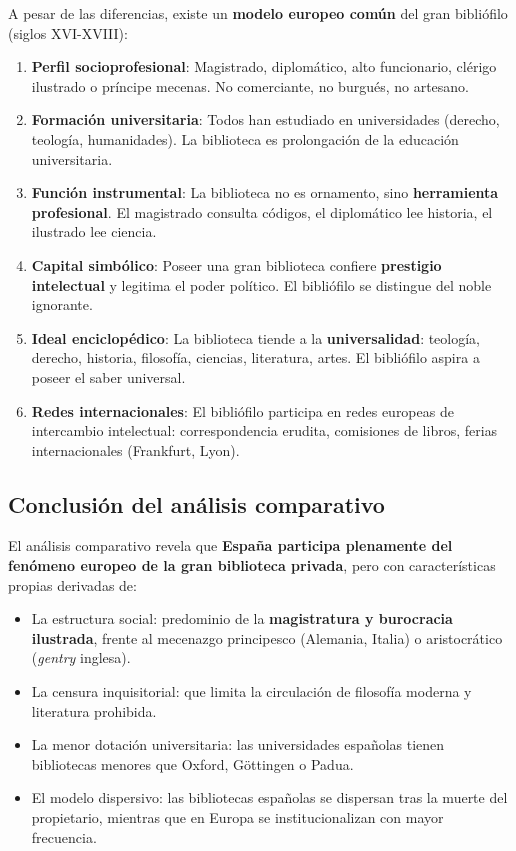 \documentclass[11pt,a4paper]{article}
\begin{document}
A pesar de las diferencias, existe un \textbf{modelo europeo común} del gran bibliófilo (siglos XVI-XVIII):

\begin{enumerate}
\item \textbf{Perfil socioprofesional}: Magistrado, diplomático, alto funcionario, clérigo ilustrado o príncipe mecenas. No comerciante, no burgués, no artesano.

\item \textbf{Formación universitaria}: Todos han estudiado en universidades (derecho, teología, humanidades). La biblioteca es prolongación de la educación universitaria.

\item \textbf{Función instrumental}: La biblioteca no es ornamento, sino \textbf{herramienta profesional}. El magistrado consulta códigos, el diplomático lee historia, el ilustrado lee ciencia.

\item \textbf{Capital simbólico}: Poseer una gran biblioteca confiere \textbf{prestigio intelectual} y legitima el poder político. El bibliófilo se distingue del noble ignorante.

\item \textbf{Ideal enciclopédico}: La biblioteca tiende a la \textbf{universalidad}: teología, derecho, historia, filosofía, ciencias, literatura, artes. El bibliófilo aspira a poseer el saber universal.

\item \textbf{Redes internacionales}: El bibliófilo participa en redes europeas de intercambio intelectual: correspondencia erudita, comisiones de libros, ferias internacionales (Frankfurt, Lyon).
\end{enumerate}

\subsection{Conclusión del análisis comparativo}

El análisis comparativo revela que \textbf{España participa plenamente del fenómeno europeo de la gran biblioteca privada}, pero con características propias derivadas de:

\begin{itemize}
\item La estructura social: predominio de la \textbf{magistratura y burocracia ilustrada}, frente al mecenazgo principesco (Alemania, Italia) o aristocrático (\textit{gentry} inglesa).
\item La censura inquisitorial: que limita la circulación de filosofía moderna y literatura prohibida.
\item La menor dotación universitaria: las universidades españolas tienen bibliotecas menores que Oxford, Göttingen o Padua.
\item El modelo dispersivo: las bibliotecas españolas se dispersan tras la muerte del propietario, mientras que en Europa se institucionalizan con mayor frecuencia.
\end{itemize}
\end{document}
